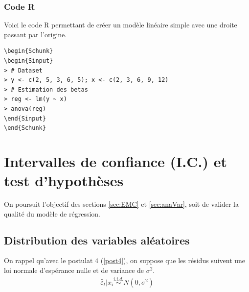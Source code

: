 \documentclass[11pt,french]{report}
\begin{document}
\subsubsection*{Code R}
Voici le code R permettant de créer un modèle linéaire simple avec une droite passant par l'origine.

\begin{lstlisting}[linerange=\\begin\{Sinput\}-\\end\{Sinput\},includerangemarker=false, caption = Code source en R pour l'exemple]
\begin{Schunk}
\begin{Sinput}
> # Dataset
> y <- c(2, 5, 3, 6, 5); x <- c(2, 3, 6, 9, 12)
> # Estimation des betas
> reg <- lm(y ~ x)
> anova(reg)
\end{Sinput}
\end{Schunk}
\end{lstlisting}
\bigskip


\section{Intervalles de confiance (I.C.) et test d'hypothèses}
On poursuit l'objectif des sections \ref{sec:EMC} et \ref{sec:anaVar}, soit de valider la qualité du modèle de régression.

\subsection{Distribution des variables aléatoires}
\label{sec:distri}
On rappel qu'avec le postulat 4 (\ref{post4}), on suppose que les résidus suivent une loi normale d'espérance nulle et de variance de $\sigma^2$.
	\begin{align*}
\hat{\varepsilon}_t|x_i \overset{i.i.d.}{\sim} N(0, \sigma^2)
	\end{align*}
\end{document}
